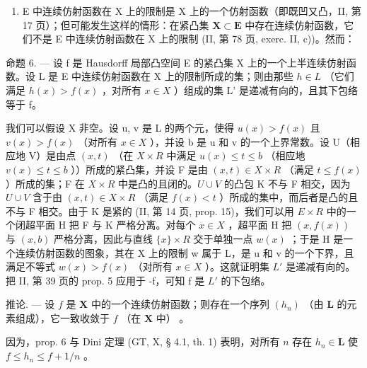 \begin{enumerate}
\def\labelenumi{\arabic{enumi})}
\setcounter{enumi}{2}
\tightlist
\item
  E 中连续仿射函数在 X 上的限制是 X 上的一个仿射函数（即既凹又凸，II, 第 17 页）；但可能发生这样的情形：在紧凸集 \(\mathbf{X} \subset \mathbf{E}\) 中存在连续仿射函数，它们不是 E 中连续仿射函数在 X 上的限制 (II, 第 78 页, exerc. II, c))。然而：
\end{enumerate}

命题 6. --- 设 f 是 Hausdorff 局部凸空间 E 的紧凸集 X 上的一个上半连续仿射函数。设 L 是 E 中连续仿射函数在 X 上的限制所成的集；则由那些 \(h \in L\) （它们满足 \(h(x) > f(x)\) ，对所有 \(x \in X\) ）组成的集 L' 是递减有向的，且其下包络等于 f。

我们可以假设 X 非空。设 u, v 是 L 的两个元，使得 \(u(x) > f(x)\) 且 \(v(x) > f(x)\) （对所有 \(x \in X\) ），并设 b 是 u 和 v 的一个上界常数。设 U（相应地 V）是由点 \((x, t)\) （在 \(X \times R\) 中满足 \(u(x) \leqslant t \leqslant b\) （相应地 \(v(x) \leqslant t \leqslant b\) ））所成的紧凸集，并设 F 是由 \((x, t) \in X \times R\) （满足 \(t \leqslant f(x)\) ）所成的集；F 在 \(X \times R\) 中是凸的且闭的。\(U \cup V\) 的凸包 K 不与 F 相交，因为 \(U \cup V\) 含于由 \((x, t) \in X \times R\) （满足 \(f(x) < t\) ）所成的集中，而后者是凸的且不与 F 相交。由于 K 是紧的 (II, 第 14 页, prop. 15)，我们可以用 \(E \times R\) 中的一个闭超平面 H 把 F 与 K 严格分离。对每个 \(x \in X\) ，超平面 H 把 \((x, f(x))\) 与 \((x, b)\) 严格分离，因此与直线 \(\{x\} \times R\) 交于单独一点 \(w(x)\) ；于是 H 是一个连续仿射函数的图象，其在 X 上的限制 w 属于 L，是 u 和 v 的一个下界，且满足不等式 \(w(x) > f(x)\) （对所有 \(x \in X\) ）。这就证明集 \(L'\) 是递减有向的。把 II, 第 39 页的 prop. 5 应用于 -f，可知 f 是 \(L'\) 的下包络。

推论. --- 设 \(f\) 是 \(\mathbf{X}\) 中的一个连续仿射函数；则存在一个序列 \((h_n)\) （由 \(\mathbf{L}\) 的元素组成），它一致收敛于 \(f\) （在 \(\mathbf{X}\) 中） 。

因为，prop. 6 与 Dini 定理 (GT, X, § 4.1, th. 1) 表明，对所有 \(n\) 存在 \(h_n \in \mathbf{L}\) 使 \(f \leqslant h_n \leqslant f + 1/n\) 。

